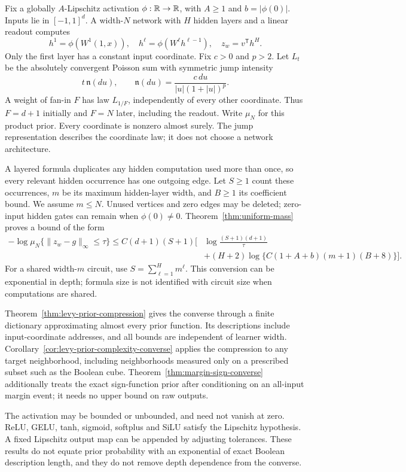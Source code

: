 \documentclass[11pt]{article}
\begin{document}
Fix a globally $A$-Lipschitz activation $\phi:\mathbb R\to\mathbb R$, with $A\ge1$ and $b=|\phi(0)|$. Inputs lie in $[-1,1]^d$. A width-$N$ network with $H$ hidden layers and a linear readout computes
\[
 h^1=\phi(W^1(1,x)),\quad h^\ell=\phi(W^\ell h^{\ell-1}),
 \quad z_w=v^{\mathsf T}h^H.
\]
Only the first layer has a constant input coordinate. Fix $c>0$ and $p>2$. Let $L_t$ be the absolutely convergent Poisson sum with symmetric jump intensity
\[
 t\,\mathfrak n(du),\qquad
 \mathfrak n(du)=\frac{c\,du}{|u|(1+|u|)^p}.
\]
A weight of fan-in $F$ has law $L_{1/F}$, independently of every other coordinate. Thus $F=d+1$ initially and $F=N$ later, including the readout. Write $\mu_N$ for this product prior. Every coordinate is nonzero almost surely. The jump representation describes the coordinate law; it does not choose a network architecture.

A layered formula duplicates any hidden computation used more than once, so every relevant hidden occurrence has one outgoing edge. Let $S\ge1$ count these occurrences, $m$ be its maximum hidden-layer width, and $B\ge1$ its coefficient bound. We assume $m\le N$. Unused vertices and zero edges may be deleted; zero-input hidden gates can remain when $\phi(0)\ne0$. Theorem~\ref{thm:uniform-mass} proves a bound of the form
\begin{align*}
 -\log\mu_N\{\|z_w-g\|_\infty\le\tau\}
 \le C(d+1)(S+1)\Bigg[&\log\frac{(S+1)(d+1)}\tau\\
 &+(H+2)\log\{C(1+A+b)(m+1)(B+8)\}\Bigg].
\end{align*}
For a shared width-$m$ circuit, use $S=\sum_{\ell=1}^H m^\ell$. This conversion can be exponential in depth; formula size is not identified with circuit size when computations are shared.

Theorem~\ref{thm:levy-prior-compression} gives the converse through a finite dictionary approximating almost every prior function. Its descriptions include input-coordinate addresses, and all bounds are independent of learner width. Corollary~\ref{cor:levy-prior-complexity-converse} applies the compression to any target neighborhood, including neighborhoods measured only on a prescribed subset such as the Boolean cube. Theorem~\ref{thm:margin-sign-converse} additionally treats the exact sign-function prior after conditioning on an all-input margin event; it needs no upper bound on raw outputs.

The activation may be bounded or unbounded, and need not vanish at zero. ReLU, GELU, tanh, sigmoid, softplus and SiLU satisfy the Lipschitz hypothesis. A fixed Lipschitz output map can be appended by adjusting tolerances. These results do not equate prior probability with an exponential of exact Boolean description length, and they do not remove depth dependence from the converse.
\end{document}
